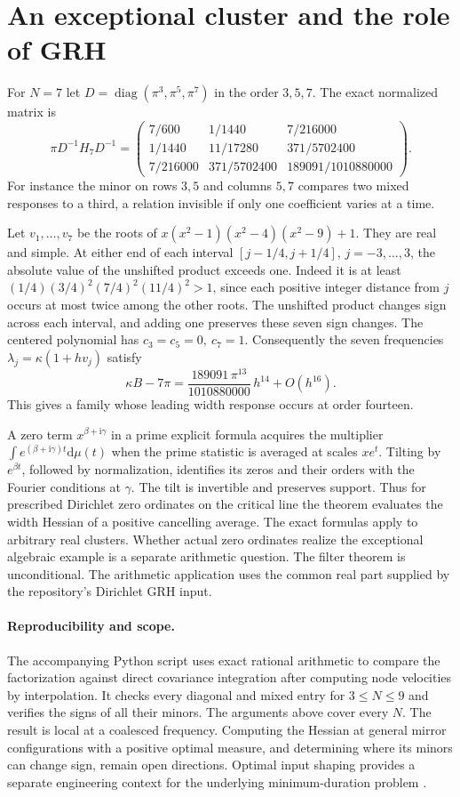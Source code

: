 \documentclass[11pt]{article}
\newcommand{\ii}{\mathrm i}
\newcommand{\dd}{\mathrm d}
\begin{document}
\section{An exceptional cluster and the role of GRH}
For $N=7$ let $D=\operatorname{diag}(\pi^3,\pi^5,\pi^7)$ in the order
$3,5,7$. The exact normalized matrix is
\[
 \pi D^{-1}H_7 D^{-1}=
 \begin{pmatrix}
 7/600 & 1/1440 & 7/216000\\
 1/1440 & 11/17280 & 371/5702400\\
 7/216000 & 371/5702400 & 189091/1010880000
 \end{pmatrix}.
\]
For instance the minor on rows $3,5$ and columns $5,7$ compares two
mixed responses to a third, a relation invisible if only one
coefficient varies at a time.

Let $v_1,\ldots,v_7$ be the roots of
$x(x^2-1)(x^2-4)(x^2-9)+1$. They are real and simple. At either end
of each interval $[j-1/4,j+1/4]$, $j=-3,\ldots,3$, the absolute
value of the unshifted product exceeds one. Indeed it is at least
$(1/4)(3/4)^2(7/4)^2(11/4)^2>1$, since each positive integer
distance from $j$ occurs at most twice among the other roots.
The unshifted product changes sign across each interval, and adding one
preserves these seven sign changes. The centered polynomial has
$c_3=c_5=0,\ c_7=1$. Consequently the seven frequencies
$\lambda_j=\kappa(1+hv_j)$ satisfy
\[
 \kappa B-7\pi=
 \frac{189091\,\pi^{13}}{1010880000}\,h^{14}+O(h^{16}).
\]
This gives a family whose leading width response occurs at order fourteen.

A zero term $x^{\beta+\ii\gamma}$ in a prime explicit formula acquires
the multiplier $\int e^{(\beta+\ii\gamma)t}\dd\mu(t)$ when the
prime statistic is averaged at scales $xe^t$. Tilting by
$e^{\beta t}$, followed by normalization, identifies its zeros and
their orders with the Fourier conditions at $\gamma$. The tilt is
invertible and preserves support. Thus for prescribed Dirichlet zero
ordinates on the critical line the theorem evaluates the width Hessian
of a positive cancelling average. The exact formulas apply to arbitrary
real clusters. Whether actual zero ordinates realize the exceptional
algebraic example is a separate arithmetic question. The filter
theorem is unconditional. The arithmetic application uses the common
real part supplied by the repository's Dirichlet GRH input.

\paragraph{Reproducibility and scope.}
The accompanying Python script uses exact rational arithmetic to compare
the factorization against direct covariance integration after computing
node velocities by interpolation. It checks every diagonal and mixed
entry for $3\le N\le9$ and verifies the signs of all their minors. The arguments above cover every $N$.
The result is local at a coalesced frequency. Computing the Hessian at
general mirror configurations with a positive optimal measure, and
determining where its minors can change sign, remain open directions.
Optimal input shaping provides a separate engineering context for the
underlying minimum-duration problem \cite{lau}.
\end{document}
